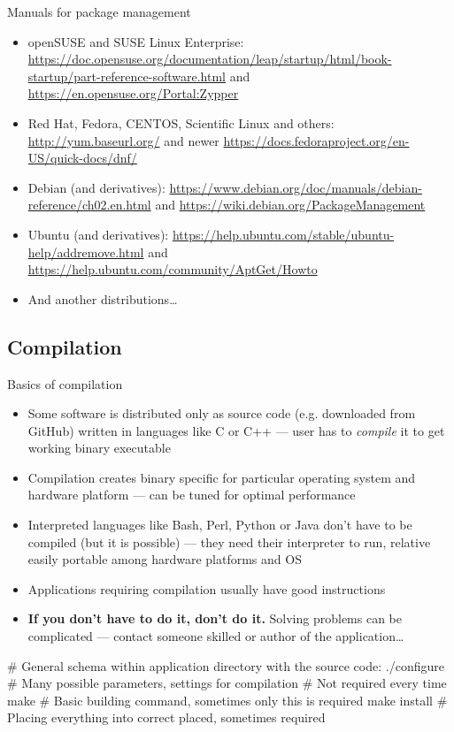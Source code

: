 \documentclass[compress, xelatex, 11pt, xcolor=svgnames, aspectratio=169,
	hyperref={
		bookmarks=true,
		unicode=true,
		colorlinks=true,
		pdftitle={Linux, command line and MetaCentrum},
		plainpages=false,
		pdfauthor={Vojtech Zeisek},
		pdfsubject={Course about use of Linux command line, writing shell scripts and using MetaCentrum of CESNET},
		pdfcreator={XeLaTeX},
		pdfkeywords={Linux, GNU, BASH, shell, command line, MetaCentrum},
		linkcolor=DarkRed, %
		anchorcolor=DarkBlue, %
		citecolor=Indigo, %
		filecolor=NavyBlue, %
		menucolor=DarkMagenta, %
		urlcolor=DarkBlue, %
		},
	url={hyphens, lowtilde} %
	]{beamer}
\begin{document}
\begin{frame}{Manuals for package management}
	\begin{itemize}
		\item openSUSE and SUSE Linux Enterprise: \url{https://doc.opensuse.org/documentation/leap/startup/html/book-startup/part-reference-software.html} and \url{https://en.opensuse.org/Portal:Zypper}
		\item Red Hat, Fedora, CENTOS, Scientific Linux and others: \url{http://yum.baseurl.org/} and newer \url{https://docs.fedoraproject.org/en-US/quick-docs/dnf/}
		\item Debian (and derivatives): \url{https://www.debian.org/doc/manuals/debian-reference/ch02.en.html} and \url{https://wiki.debian.org/PackageManagement}
		\item Ubuntu (and derivatives): \url{https://help.ubuntu.com/stable/ubuntu-help/addremove.html} and \url{https://help.ubuntu.com/community/AptGet/Howto}
		\item And another distributions\ldots
	\end{itemize}
\end{frame}

\subsection{Compilation}

\begin{frame}[fragile]{Basics of compilation}
	\begin{itemize}
		\item Some software is distributed only as source code (e.g. downloaded from GitHub) written in languages like C or C++ --- user has to \textit{compile} it to get working binary executable
		\item Compilation creates binary specific for particular operating system and hardware platform --- can be tuned for optimal performance
		\item Interpreted languages like Bash, Perl, Python or Java don't have to be compiled (but it is possible) --- they need their interpreter to run, relative easily portable among hardware platforms and OS
		\item Applications requiring compilation usually have good instructions
		\item \textbf{If you don't have to do it, don't do it.}\textbf{} Solving problems can be complicated --- contact someone skilled or author of the application\ldots
	\end{itemize}
	\begin{bashcode}
    # General schema within application directory with the source code:
    ./configure # Many possible parameters, settings for compilation
                # Not required every time
    make # Basic building command, sometimes only this is required
    make install # Placing everything into correct placed, sometimes required
	\end{bashcode}
\end{frame}
\end{document}
